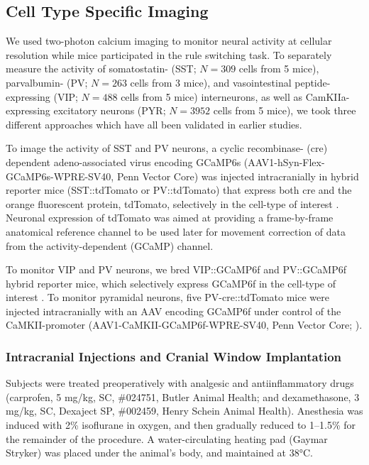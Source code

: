 
\subsection*{Cell Type Specific Imaging}
We used two-photon calcium imaging to monitor neural activity at cellular resolution while mice participated in the rule switching task. To separately measure the activity of somatostatin- (SST; $N=309$ cells from 5 mice), parvalbumin- (PV; $N=263$ cells from 3 mice), and vasointestinal peptide-expressing (VIP; $N=488$ cells from 5 mice) interneurons, as well as CamKIIa-expressing excitatory neurons (PYR; $N=3952$ cells from 5 mice), we took three different approaches which have all been validated in earlier studies.

To image the activity of SST and PV neurons, a cyclic recombinase- (cre) dependent adeno-associated virus encoding GCaMP6s (AAV1-hSyn-Flex-GCaMP6s-WPRE-SV40, Penn Vector Core) was injected intracranially in hybrid reporter mice (SST::tdTomato or PV::tdTomato) that express both cre and the orange fluorescent protein, tdTomato, selectively in the cell-type of interest \citep{taniguchi11, ali20}. Neuronal expression of tdTomato was aimed at providing a frame-by-frame anatomical reference channel to be used later for movement correction of data from the activity-dependent (GCaMP) channel. 

To monitor VIP and PV neurons, we bred VIP::GCaMP6f and PV::GCaMP6f hybrid reporter mice, which selectively express GCaMP6f in the cell-type of interest \citep{daigle18,devries20}. 
To monitor pyramidal neurons, five PV-cre::tdTomato mice were injected intracranially with an AAV encoding GCaMP6f under control of the CaMKII-promoter (AAV1-CaMKII-GCaMP6f-WPRE-SV40, Penn Vector Core; \cite{kuchibhotla17,ali20}). 

\subsubsection*{Intracranial Injections and Cranial Window Implantation}
Subjects were treated preoperatively with analgesic and antiinflammatory drugs (car\-profen, 5 mg/kg, SC, \#024751, Butler Animal Health; and dexamethasone, 3 mg/kg, SC, Dexaject SP, \#002459, Henry Schein Animal Health). Anesthesia was induced with 2\% isoflurane in oxygen, and then gradually reduced to 1--1.5\% for the remainder of the procedure. A water-circulating heating pad (Gaymar Stryker) was placed under the animal’s body, and maintained at 38\si{\celsius}.

